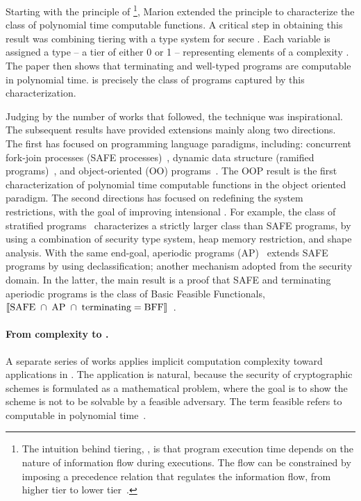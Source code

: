 Starting with the principle of {\emph{}}\footnote{
The intuition behind tiering, \aka {}, is that program execution time depends on the nature of information flow during executions.
The flow can be constrained by imposing a precedence relation that regulates the information flow,
\eg from higher tier to lower tier~\cite{leivant1995, leivant2013}.},
Marion extended the principle to characterize the class of polynomial time computable functions.
A critical step in obtaining this result was combining tiering with a type system for secure .
Each variable is assigned a type -- a {tier} of either 0 or 1 -- representing elements of a complexity .
The paper then shows that terminating and well-typed programs are computable in polynomial time.
 is precisely the class of programs captured by this characterization.

Judging by the number of works that followed, the technique was inspirational.
The subsequent results have provided extensions mainly along two directions.
The first has focused on programming language paradigms, including: 
concurrent fork-join processes (SAFE processes)~\cite{hainry2013},
dynamic data structure (ramified programs)~\cite{leivant2013}, and
{object-oriented (OO) programs}~\cite{hainry2015}.
The OOP result is the first characterization of polynomial time computable functions in the object oriented paradigm.
The second directions has focused on redefining the system restrictions, with the goal of improving intensional .
For example, the class of stratified programs~\cite{hainry2023} characterizes a strictly larger class than SAFE programs,
by using a combination of {security type system}, heap memory restriction, and shape analysis.
With the same end-goal, aperiodic programs (AP)~\cite{hainry2024} extends SAFE programs by using declassification;
another mechanism adopted from the security domain.
In the latter, the main result is a proof that SAFE and terminating aperiodic programs is the class of Basic Feasible Functionals, \ie \(\llbracket\text{SAFE}\;\cap\;\text{AP}\;\cap\;\text{terminating} = \text{BFF}\rrbracket\)~\cite{hainry2020,hainry2024}.

\paragraph*{From complexity to .}
A separate series of works applies implicit computation complexity toward applications in .
The application is natural, because the security of cryptographic schemes is formulated as a mathematical problem, where the goal is to show the scheme is not to be solvable by a feasible adversary.
The term feasible refers to computable in polynomial time~\cite{feree2018}.

